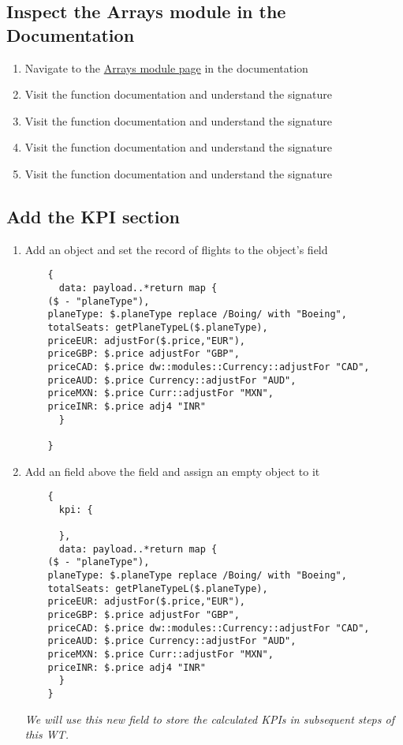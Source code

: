 \subsection{Inspect the Arrays module in the Documentation}
\begin{enumerate}
\item Navigate to the \href{https://docs.mulesoft.com/mule-runtime/4.3/dw-arrays}{Arrays module page} in the documentation
\item Visit the  function documentation and understand the signature
\item Visit the  function documentation and understand the signature
\item Visit the  function documentation and understand the signature
\item Visit the  function documentation and understand the signature
\end{enumerate}

\subsection{Add the KPI section}
\begin{enumerate}[resume*]
\item Add an object and set the record of flights to the object's  field
  \begin{lstlisting}
    {
      data: payload..*return map {
	($ - "planeType"),
	planeType: $.planeType replace /Boing/ with "Boeing",
	totalSeats: getPlaneTypeL($.planeType),
	priceEUR: adjustFor($.price,"EUR"),
	priceGBP: $.price adjustFor "GBP",
	priceCAD: $.price dw::modules::Currency::adjustFor "CAD",
	priceAUD: $.price Currency::adjustFor "AUD",
	priceMXN: $.price Curr::adjustFor "MXN",
	priceINR: $.price adj4 "INR"
      }
      
    }
  \end{lstlisting}
\item Add an  field above the  field and assign an empty object to it
  \begin{lstlisting}
    {
      kpi: {
	
      },
      data: payload..*return map {
	($ - "planeType"),
	planeType: $.planeType replace /Boing/ with "Boeing",
	totalSeats: getPlaneTypeL($.planeType),
	priceEUR: adjustFor($.price,"EUR"),
	priceGBP: $.price adjustFor "GBP",
	priceCAD: $.price dw::modules::Currency::adjustFor "CAD",
	priceAUD: $.price Currency::adjustFor "AUD",
	priceMXN: $.price Curr::adjustFor "MXN",
	priceINR: $.price adj4 "INR"
      }
    }
  \end{lstlisting}
  \emph{
    We will use this new field to store the calculated KPIs in subsequent steps of this WT.
  }
\end{enumerate}

